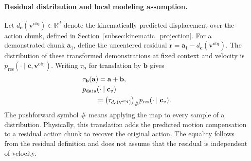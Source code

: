 \documentclass[10pt,twocolumn,letterpaper]{article}
\begin{document}
\paragraph{Residual distribution and local modeling assumption.}
Let $d_{\mathbf c}(\mathbf v^{\mathrm{obj}})\in\mathbb R^d$ denote the
kinematically predicted displacement over the action chunk, defined in
Section~\ref{subsec:kinematic_projection}. For a demonstrated chunk
$\mathbf a_1$, define the uncentered residual
$\mathbf r=\mathbf a_1-d_{\mathbf c}(\mathbf v^{\mathrm{obj}})$.
The distribution of these transformed demonstrations at fixed context and
velocity is $p_{\mathrm{res}}(\cdot\mid\mathbf c,\mathbf v^{\mathrm{obj}})$.
Writing $\tau_{\mathbf b}$ for translation by $\mathbf b$ gives
\begin{align}
    &\tau_{\mathbf b}(\mathbf a)=\mathbf a+\mathbf b, \notag\\
    &p_{\mathrm{data}}(\cdot\mid\mathbf c_v) \notag\\
    &\qquad=\bigl(\tau_{d_{\mathbf c}(\mathbf v^{\mathrm{obj}})}\bigr)_{\#}
    p_{\mathrm{res}}(\cdot\mid\mathbf c_v).
    \label{eq:residual_pushforward_identity}
\end{align}
The pushforward symbol $\#$ means applying the map to every sample of a
distribution. Physically, this translation adds the predicted motion
compensation to a residual action chunk to recover the original action.
The equality follows from the residual definition and does not assume
that the residual is independent of velocity.
\end{document}
